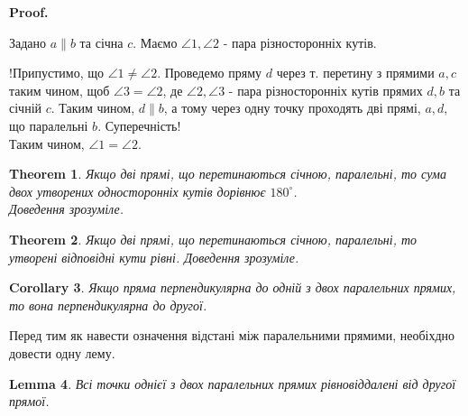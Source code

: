 \documentclass[a4paper, 10pt]{article}
\makeatletter
\def\qed{$\blacksquare$}
\theoremstyle{theoremdd}
\newtheorem{theorem}{Theorem}[subsection]
\theoremstyle{theoremdd}
\theoremstyle{theoremdd}
\theoremstyle{theoremdd}
\theoremstyle{theoremdd}
\theoremstyle{theoremdd}
\theoremstyle{theoremdd}
\theoremstyle{theoremdd}
\newtheorem{lemma}[theorem]{Lemma}
\theoremstyle{theoremdd}
\newtheorem{corollary}[theorem]{Corollary}
\renewenvironment{proof}[1][Proof.\\]{\par
\pushQED{\hfill \qed}%
\normalfont \topsep6\p@\@plus6\p@\relax
\trivlist
\item\relax
{\bfseries
#1\@addpunct{.}}\hspace\labelsep\ignorespaces
}{%
\popQED\endtrivlist\@endpefalse
}
\makeatother
\begin{document}
\begin{proof}
Задано $a \parallel b$ та січна $c$. Маємо $\angle 1, \angle 2$ - пара різносторонніх кутів.
\begin{figure}[H]
\centering
{}
\end{figure}
!Припустимо, що $\angle 1 \neq \angle 2$. Проведемо пряму $d$ через т. перетину з прямими $a,c$ таким чином, щоб $\angle 3 = \angle 2$, де $\angle 2, \angle 3$ - пара різносторонніх кутів прямих $d,b$ та січній $c$. Таким чином, $d \parallel b$, а тому через одну точку проходять дві прямі, $a,d$, що паралельні $b$. Суперечність!\\
Таким чином, $\angle 1 = \angle 2$.
\end{proof}

\begin{theorem}
Якщо дві прямі, що перетинаються січною, паралельні, то сума двох утворених односторонніх кутів дорівнює $180^\circ$.\\
\textit{Доведення зрозуміле.}
\end{theorem}

\begin{theorem}
Якщо дві прямі, що перетинаються січною, паралельні, то утворені відповідні кути рівні.
\textit{Доведення зрозуміле.}
\end{theorem}

\begin{corollary}
Якщо пряма перпендикулярна до одній з двох паралельних прямих, то вона перпендикулярна до другої.
\end{corollary}

Перед тим як навести означення відстані між паралельними прямими, необіхдно довести одну лему.
\begin{lemma}
Всі точки однієї з двох паралельних прямих рівновіддалені від другої прямої.
\end{lemma}
\end{document}
